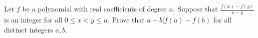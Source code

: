 Let \(f\) be a polynomial with real coefficients of degree \(n\). Suppose that \(\displaystyle \frac{f(x)-f(y)}{x-y}\) is an integer for all \(0 \leq x<y \leq n\). Prove that \(a-b | f(a)-f(b)\) for all distinct integers \(a,b\).